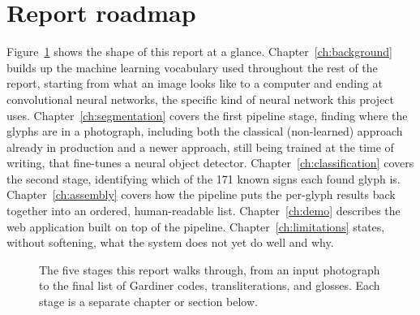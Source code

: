 \documentclass[11pt,a4paper]{report}
\begin{document}
\section{Report roadmap}

Figure~\ref{fig:research-flow} shows the shape of this report at a glance.
Chapter~\ref{ch:background} builds up the machine learning vocabulary used
throughout the rest of the report, starting from what an image looks like to
a computer and ending at convolutional neural networks, the specific kind of
neural network this project uses. Chapter~\ref{ch:segmentation} covers the
first pipeline stage, finding where the glyphs are in a photograph, including
both the classical (non-learned) approach already in production and a newer
approach, still being trained at the time of writing, that fine-tunes a
neural object detector. Chapter~\ref{ch:classification} covers the second
stage, identifying which of the 171 known signs each found glyph is.
Chapter~\ref{ch:assembly} covers how the pipeline puts the per-glyph results
back together into an ordered, human-readable list. Chapter~\ref{ch:demo}
describes the web application built on top of the pipeline.
Chapter~\ref{ch:limitations} states, without softening, what the system does
not yet do well and why.

\begin{figure}[t]
\centering
{}
\caption{The five stages this report walks through, from an input photograph
to the final list of Gardiner codes, transliterations, and glosses. Each
stage is a separate chapter or section below.}
\label{fig:research-flow}
\end{figure}
\end{document}
